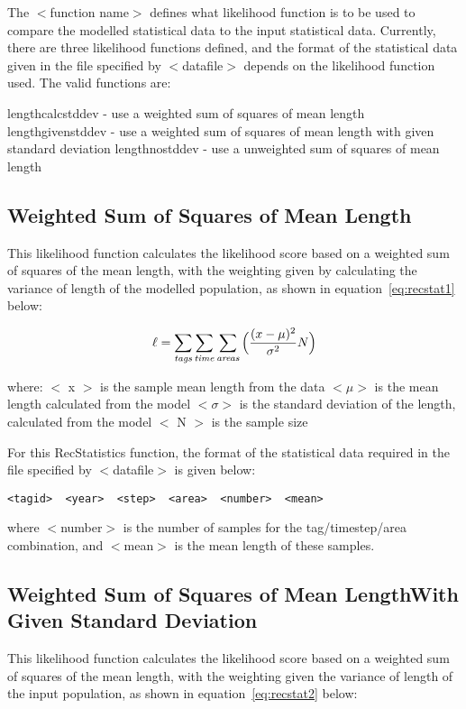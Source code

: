 \documentclass[10pt,twoside]{book}
\begin{document}
\bigskip
The $<$function name$>$ defines what likelihood function is to be used to compare the modelled statistical data to the input statistical data.  Currently, there are three likelihood functions defined, and the format of the statistical data given in the file specified by $<$datafile$>$ depends on the likelihood function used.  The valid functions are:

\bigskip
lengthcalcstddev - use a weighted sum of squares of mean length\newline
lengthgivenstddev - use a weighted sum of squares of mean length with given standard deviation\newline
lengthnostddev - use a unweighted sum of squares of mean length

\subsection{Weighted Sum of Squares of Mean Length}
This likelihood function calculates the likelihood score based on a weighted sum of squares of the mean length, with the weighting given by calculating the variance of length of the modelled population, as shown in equation~\ref{eq:recstat1} below:

\begin{equation}\label{eq:recstat1}
\ell = \sum_{\it tags}\sum_{\it time}\sum_{\it areas} \Big(\frac{(x-\mu)^2} {\sigma^2} N\Big)
\end{equation}

where:\newline
$<$ x $>$ is the sample mean length from the data\newline
$<\mu>$ is the mean length calculated from the model\newline
$<\sigma>$ is the standard deviation of the length, calculated from the model\newline
$<$ N $>$ is the sample size

\bigskip
For this RecStatistics function, the format of the statistical data required in the file specified by $<$datafile$>$ is given below:

{\small\begin{verbatim}
<tagid>  <year>  <step>  <area>  <number>  <mean>
\end{verbatim}}

where $<$number$>$ is the number of samples for the tag/timestep/area combination, and $<$mean$>$ is the mean length of these samples.

\subsection{Weighted Sum of Squares of Mean Length\newline With Given Standard Deviation}
This likelihood function calculates the likelihood score based on a weighted sum of squares of the mean length, with the weighting given the variance of length of the input population, as shown in  equation~\ref{eq:recstat2} below:
\end{document}
